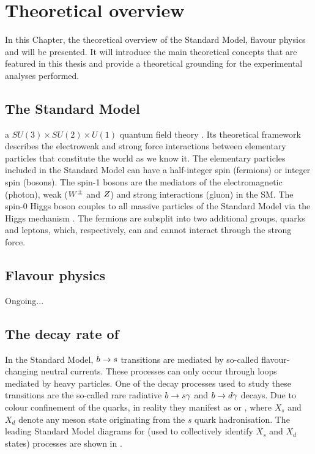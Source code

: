 \chapter{Theoretical overview}

In this Chapter, the theoretical overview of the Standard Model, flavour physics and \BtoXsgamma will be presented.
It will introduce the main theoretical concepts that are featured in this thesis and provide a theoretical grounding for the experimental analyses performed.

\section{The Standard Model}

a $SU(3)\times SU(2)\times U(1)$ quantum field theory \cite{Peskin:1995ev}.
Its theoretical framework describes the electroweak and strong force interactions between elementary particles that constitute the world as we know it.
The elementary particles included in the Standard Model can have a half-integer spin (fermions) or integer spin (bosons).
The spin-1 bosons are the mediators of the electromagnetic (photon), weak ($W^\pm$ and $Z$) and strong interactions (gluon) in the SM.
The spin-0 Higgs boson couples to all massive particles of the Standard Model via the Higgs mechanism \cite{PhysRevLett.13.508}.
The fermions are subsplit into two additional groups, quarks and leptons, which, respectively, can and cannot interact through the strong force.

\section{Flavour physics}

Ongoing...

\section{The decay rate of \texorpdfstring{\BtoXsdgamma}{B->Xsg}}\label{sec:btosgamma_totalrate_theory}

In the Standard Model, $b\rightarrow s$ transitions are mediated by so-called flavour-changing neutral currents.
These processes can only occur through loops mediated by heavy particles.
One of the decay processes used to study these transitions are the so-called rare radiative $b\rightarrow s\gamma$ and $b\rightarrow d\gamma$ decays.
Due to colour confinement of the quarks, in reality they manifest as \BtoXsgamma or \BtoXdgamma, where $X_s$ and $X_d$ denote any meson state originating from the $s$ quark hadronisation.
The leading Standard Model diagrams for \BtoXsdgamma (used to collectively identify $X_s$ and $X_d$ states) processes are shown in .


